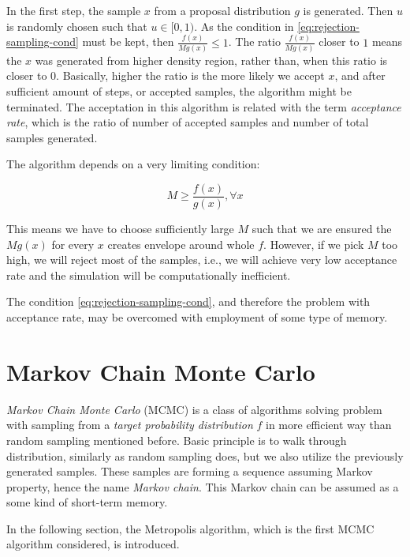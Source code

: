 \documentclass[
  digital, %
  oneside, %
  lof,     %
  lot,     %
]{fithesis4}
\begin{document}
In the first step, the sample $x$ from a proposal
distribution $g$ is generated.
Then $u$ is randomly chosen such that $u \in [0, 1)$.
As the condition in \eqref{eq:rejection-sampling-cond}
must be kept, then $\frac{f(x)}{M g(x)} \leq 1$.
The ratio $\frac{f(x)}{M g(x)}$ closer to $1$
means the $x$ was generated from higher density
region, rather than, when this ratio is closer 
to $0$.
Basically, higher the ratio is the more likely
we accept $x$, and after sufficient amount of 
steps, or accepted samples, the algorithm might 
be terminated.
The acceptation in this algorithm is related 
with the term \textit{acceptance rate}, which is
the ratio of number of accepted samples and 
number of total samples generated.

The algorithm depends on a very limiting condition:

\begin{equation}\label{eq:rejection-sampling-cond}
  M \geq \frac{f(x)}{g(x)}, \forall x
\end{equation}

This means we have to choose sufficiently large $M$
such that we are ensured the $M g(x)$ for every $x$
creates envelope around whole $f$.
However, if we pick $M$ too high,
we will reject most of the samples, i.e., we will 
achieve very low acceptance rate and
the simulation will be computationally inefficient.

The condition \eqref{eq:rejection-sampling-cond},
and therefore the problem with acceptance rate,
may be overcomed with employment of some type
of memory.


\section{Markov Chain Monte Carlo}

\textit{Markov Chain Monte Carlo} (MCMC) is a class of 
algorithms solving problem with sampling from a 
\textit{target probability distribution} $f$ in more 
efficient way than random sampling mentioned before. 
Basic principle is to walk through 
distribution, similarly as random sampling 
does, but we also utilize the previously
generated samples.
These samples are forming a sequence
assuming Markov property, hence the
name \textit{Markov chain}.
This Markov chain can be assumed as a some kind of
short-term memory.

In the following section, the Metropolis algorithm,
which is the first MCMC algorithm considered, is 
introduced.

\end{document}
